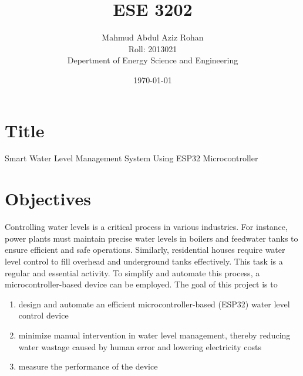 \documentclass{article}
\title{ESE 3202}
\author{Mahmud Abdul Aziz Rohan \\ Roll: 2013021 \\ Depertment of Energy 
  Science and Engineering}
\date{\today}
\theoremstyle{mytheoremstyle}
\theoremstyle{mytheoremstyle}
\theoremstyle{myproblemstyle}
\begin{document}
  \maketitle
    
  \section*{Title}
  Smart Water Level Management System Using ESP32 Microcontroller

  \section*{Objectives}
  Controlling water levels is a critical process in various industries. For 
  instance, power plants must maintain precise water levels in boilers and 
  feedwater tanks to ensure efficient and safe operations. Similarly,
  residential houses require water level control to fill overhead and
  underground tanks effectively. This task is a regular and essential activity.
  To simplify and automate this process, a microcontroller-based device can be 
  employed. The goal of this project is to

  \begin{enumerate}
    \item design and automate an efficient microcontroller-based (ESP32) water 
      level control device
    \item minimize manual intervention in water level management, thereby 
      reducing water wastage caused by human error and lowering electricity 
      costs
    \item measure the performance of the device 
  \end{enumerate}

    
\end{document}
